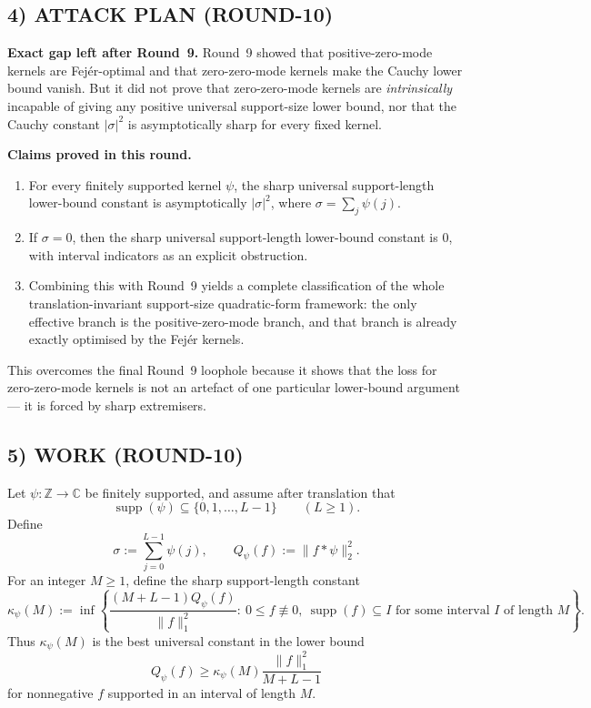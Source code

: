 \subsection{4) ATTACK PLAN (ROUND-10)}

\textbf{Exact gap left after Round~9.}
Round~9 showed that positive-zero-mode kernels are Fej\'er-optimal and that zero-zero-mode kernels make the Cauchy lower bound vanish. But it did not prove that zero-zero-mode kernels are \emph{intrinsically} incapable of giving any positive universal support-size lower bound, nor that the Cauchy constant \(|\sigma|^2\) is asymptotically sharp for every fixed kernel.

\textbf{Claims proved in this round.}
\begin{enumerate}
\item For every finitely supported kernel \(\psi\), the sharp universal support-length lower-bound constant is asymptotically \(|\sigma|^2\), where \(\sigma=\sum_j\psi(j)\).
\item If \(\sigma=0\), then the sharp universal support-length lower-bound constant is \(0\), with interval indicators as an explicit obstruction.
\item Combining this with Round~9 yields a complete classification of the whole translation-invariant support-size quadratic-form framework: the only effective branch is the positive-zero-mode branch, and that branch is already exactly optimised by the Fej\'er kernels.
\end{enumerate}

This overcomes the final Round~9 loophole because it shows that the loss for zero-zero-mode kernels is not an artefact of one particular lower-bound argument --- it is forced by sharp extremisers.

\subsection{5) WORK (ROUND-10)}

Let \(\psi:\mathbb Z\to \mathbb C\) be finitely supported, and assume after translation that
\[
\operatorname{supp}(\psi)\subseteq \{0,1,\dots,L-1\}
\qquad (L\ge 1).
\]
Define
\[
\sigma:=\sum_{j=0}^{L-1}\psi(j),
\qquad
Q_\psi(f):=\|f*\psi\|_2^2.
\]
For an integer \(M\ge 1\), define the sharp support-length constant
\[
\kappa_\psi(M):=
\inf\left\{
\frac{(M+L-1)Q_\psi(f)}{\|f\|_1^2}
:\
0\le f\not\equiv 0,
\ \operatorname{supp}(f)\subseteq I\text{ for some interval }I\text{ of length }M
\right\}.
\]
Thus \(\kappa_\psi(M)\) is the best universal constant in the lower bound
\[
Q_\psi(f)\ge \kappa_\psi(M)\frac{\|f\|_1^2}{M+L-1}
\]
for nonnegative \(f\) supported in an interval of length \(M\).

